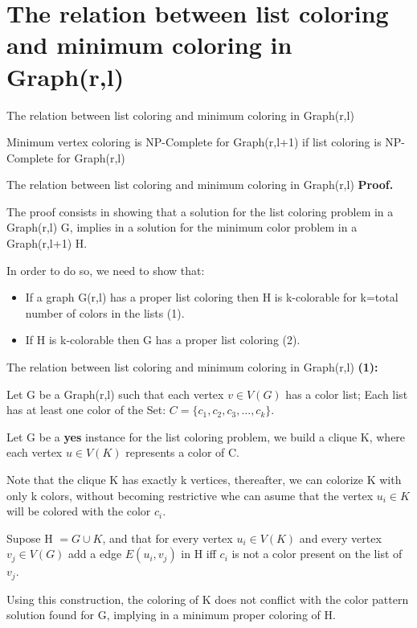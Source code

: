 \documentclass[9pt, compress]{beamer}
\begin{document}
    \section{The relation between list coloring and minimum coloring in Graph(r,l)}
    \begin{frame}{The relation between list coloring and minimum coloring in Graph(r,l)}
        \begin{theorem}
          Minimum vertex coloring is NP-Complete for Graph(r,l+1) if list coloring is NP-Complete for Graph(r,l)
        \end{theorem}
    \end{frame}
    \begin{frame}{The relation between list coloring and minimum coloring in Graph(r,l)}
        \textbf{Proof.}
        
        The proof consists in showing that a solution for the list coloring problem in a Graph(r,l) G, implies in a solution for the minimum color problem in a Graph(r,l+1) H.
        
        In order to do so, we need to show that:
          \begin{itemize}
        \item If a graph G(r,l) has a proper list coloring then H is k-colorable for k=total number of colors in the lists (1).
        \item If H is k-colorable then G has a proper list coloring (2).
      \end{itemize}
    \end{frame}
    \begin{frame}{The relation between list coloring and minimum coloring in Graph(r,l)}
      \textbf{(1):}
      
      Let G be a Graph(r,l) such that each vertex $v \in V(G)$ has a color list; 
      Each list has at least one color of the Set: $C = \{c_1,c_2,c_3,...,c_k \}$. 
      
      Let G be a \textbf{yes} instance for the list coloring problem, we build a clique K, where each vertex $u \in V(K)$ represents a color of C.
      
      Note that the clique K has exactly k vertices, thereafter, we can colorize K with only k colors, without becoming restrictive whe can asume that the vertex $u_i \in K$ will be colored with the color $c_i$.
      
      Supose H $= G \cup K$, and that for every vertex $u_i \in V(K)$ and every vertex $v_j \in V(G)$ add a edge
      $E(u_i,v_j) $ in H iff $c_i$ is not a color present on the list of $v_j$.
         
      Using this construction, the coloring of K does not conflict with the color pattern solution found for G, implying in a minimum proper coloring of H. 
    \end{frame}
\end{document}
